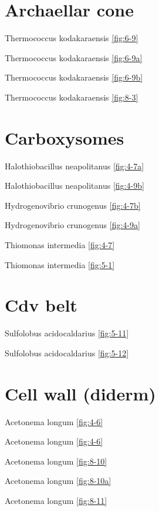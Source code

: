 \documentclass[]{tufte-book}
\begin{document}
\hypertarget{archaellar-cone}{%
\section*{Archaellar cone}\label{archaellar-cone}}

Thermococcus kodakaraensis \ref{fig:6-9}

Thermococcus kodakaraensis \ref{fig:6-9a}

Thermococcus kodakaraensis \ref{fig:6-9b}

Thermococcus kodakaraensis \ref{fig:8-3}

\hypertarget{carboxysomes-1}{%
\section*{Carboxysomes}\label{carboxysomes-1}}

Halothiobacillus neapolitanus \ref{fig:4-7a}

Halothiobacillus neapolitanus \ref{fig:4-9b}

Hydrogenovibrio crunogenus \ref{fig:4-7b}

Hydrogenovibrio crunogenus \ref{fig:4-9a}

Thiomonas intermedia \ref{fig:4-7}

Thiomonas intermedia \ref{fig:5-1}

\hypertarget{cdv-belt}{%
\section*{Cdv belt}\label{cdv-belt}}

Sulfolobus acidocaldarius \ref{fig:5-11}

Sulfolobus acidocaldarius \ref{fig:5-12}

\hypertarget{cell-wall-diderm}{%
\section*{Cell wall (diderm)}\label{cell-wall-diderm}}

Acetonema longum \ref{fig:4-6}

Acetonema longum \ref{fig:4-6}

Acetonema longum \ref{fig:8-10}

Acetonema longum \ref{fig:8-10a}

Acetonema longum \ref{fig:8-11}
\end{document}
